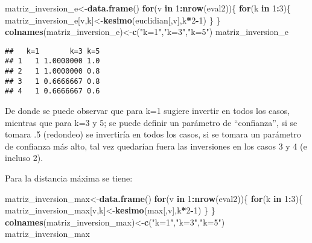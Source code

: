 \documentclass[]{article}
\newenvironment{Shaded}{\begin{snugshade}}{\end{snugshade}}
\newcommand{\KeywordTok}[1]{\textcolor[rgb]{0.13,0.29,0.53}{\textbf{#1}}}
\newcommand{\DecValTok}[1]{\textcolor[rgb]{0.00,0.00,0.81}{#1}}
\newcommand{\StringTok}[1]{\textcolor[rgb]{0.31,0.60,0.02}{#1}}
\newcommand{\ControlFlowTok}[1]{\textcolor[rgb]{0.13,0.29,0.53}{\textbf{#1}}}
\newcommand{\OperatorTok}[1]{\textcolor[rgb]{0.81,0.36,0.00}{\textbf{#1}}}
\newcommand{\NormalTok}[1]{#1}
\begin{document}
\begin{Shaded}
\begin{Highlighting}[]
\NormalTok{matriz_inversion_e<-}\KeywordTok{data.frame}\NormalTok{()}
\ControlFlowTok{for}\NormalTok{(v }\ControlFlowTok{in} \DecValTok{1}\OperatorTok{:}\KeywordTok{nrow}\NormalTok{(eval2))\{}
  \ControlFlowTok{for}\NormalTok{(k }\ControlFlowTok{in} \DecValTok{1}\OperatorTok{:}\DecValTok{3}\NormalTok{)\{}
\NormalTok{    matriz_inversion_e[v,k]<-}\KeywordTok{kesimo}\NormalTok{(euclidian[,v],k}\OperatorTok{*}\DecValTok{2}\OperatorTok{-}\DecValTok{1}\NormalTok{)}
\NormalTok{  \}}
\NormalTok{\}}
\KeywordTok{colnames}\NormalTok{(matriz_inversion_e)<-}\KeywordTok{c}\NormalTok{(}\StringTok{"k=1"}\NormalTok{,}\StringTok{"k=3"}\NormalTok{,}\StringTok{"k=5"}\NormalTok{)}
\NormalTok{matriz_inversion_e}
\end{Highlighting}
\end{Shaded}

\begin{verbatim}
##   k=1       k=3 k=5
## 1   1 1.0000000 1.0
## 2   1 1.0000000 0.8
## 3   1 0.6666667 0.8
## 4   1 0.6666667 0.6
\end{verbatim}

De donde se puede observar que para k=1 sugiere invertir en todos los
casos, mientras que para k=3 y 5; se puede definir un parámetro de
``confianza'', si se tomara .5 (redondeo) se invertiría en todos los
casos, si se tomara un parámetro de confianza más alto, tal vez
quedarían fuera las inversiones en los casos 3 y 4 (e incluso 2).

Para la distancia máxima se tiene:

\begin{Shaded}
\begin{Highlighting}[]
\NormalTok{matriz_inversion_max<-}\KeywordTok{data.frame}\NormalTok{()}
\ControlFlowTok{for}\NormalTok{(v }\ControlFlowTok{in} \DecValTok{1}\OperatorTok{:}\KeywordTok{nrow}\NormalTok{(eval2))\{}
  \ControlFlowTok{for}\NormalTok{(k }\ControlFlowTok{in} \DecValTok{1}\OperatorTok{:}\DecValTok{3}\NormalTok{)\{}
\NormalTok{    matriz_inversion_max[v,k]<-}\KeywordTok{kesimo}\NormalTok{(max[,v],k}\OperatorTok{*}\DecValTok{2}\OperatorTok{-}\DecValTok{1}\NormalTok{)}
\NormalTok{  \}}
\NormalTok{\}}
\KeywordTok{colnames}\NormalTok{(matriz_inversion_max)<-}\KeywordTok{c}\NormalTok{(}\StringTok{"k=1"}\NormalTok{,}\StringTok{"k=3"}\NormalTok{,}\StringTok{"k=5"}\NormalTok{)}
\NormalTok{matriz_inversion_max}
\end{Highlighting}
\end{Shaded}
\end{document}
